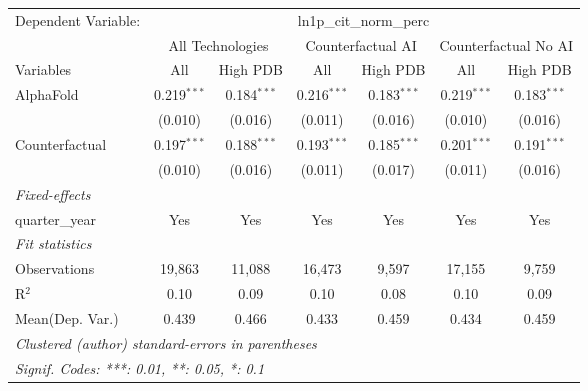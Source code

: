 \begingroup
\centering
\begin{tabular}{lcccccc}
   \tabularnewline \midrule \midrule
   Dependent Variable: & \multicolumn{6}{c}{ln1p\_cit\_norm\_perc}\\
 & \multicolumn{2}{c}{All Technologies} & \multicolumn{2}{c}{Counterfactual AI} & \multicolumn{2}{c}{Counterfactual No AI} \\
\cmidrule(lr){1-1}\cmidrule(lr){2-3} \cmidrule(lr){4-5} \cmidrule(lr){6-7}
Variables & \multicolumn{1}{c}{All} & \multicolumn{1}{c}{High PDB} & \multicolumn{1}{c}{All} & \multicolumn{1}{c}{High PDB} & \multicolumn{1}{c}{All} & \multicolumn{1}{c}{High PDB} \\
\cmidrule(lr){1-1}\cmidrule(lr){2-2} \cmidrule(lr){3-3} \cmidrule(lr){4-4} \cmidrule(lr){5-5} \cmidrule(lr){6-6} \cmidrule(lr){7-7}
   AlphaFold      & 0.219$^{***}$ & 0.184$^{***}$ & 0.216$^{***}$ & 0.183$^{***}$ & 0.219$^{***}$ & 0.183$^{***}$\\   
                  & (0.010)       & (0.016)       & (0.011)       & (0.016)       & (0.010)       & (0.016)\\   
   Counterfactual & 0.197$^{***}$ & 0.188$^{***}$ & 0.193$^{***}$ & 0.185$^{***}$ & 0.201$^{***}$ & 0.191$^{***}$\\   
                  & (0.010)       & (0.016)       & (0.011)       & (0.017)       & (0.011)       & (0.016)\\   
   \midrule
   \emph{Fixed-effects}\\
   quarter\_year  & Yes           & Yes           & Yes           & Yes           & Yes           & Yes\\  
   \midrule
   \emph{Fit statistics}\\
   Observations   & 19,863        & 11,088        & 16,473        & 9,597         & 17,155        & 9,759\\  
   R$^2$          & 0.10          & 0.09          & 0.10          & 0.08          & 0.10          & 0.09\\  
Mean(Dep. Var.) & 0.439 & 0.466 & 0.433 & 0.459 & 0.434 & 0.459 \\
   \midrule \midrule
   \multicolumn{7}{l}{\emph{Clustered (author) standard-errors in parentheses}}\\
   \multicolumn{7}{l}{\emph{Signif. Codes: ***: 0.01, **: 0.05, *: 0.1}}\\
\end{tabular}
\par\endgroup
